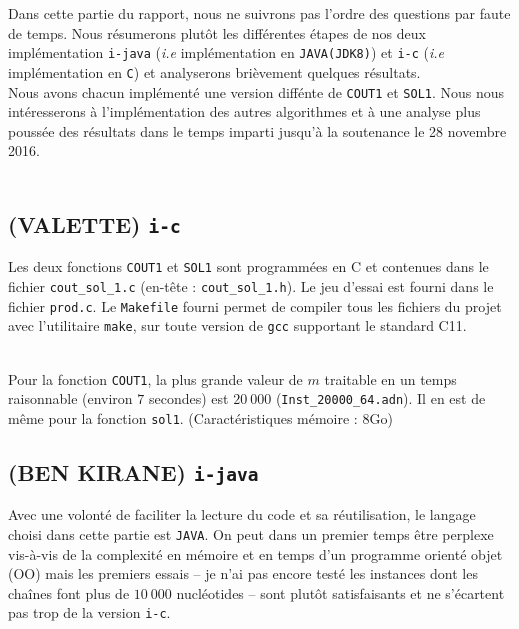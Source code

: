 Dans cette partie du rapport, nous ne suivrons pas l'ordre des
questions par faute de temps. Nous r\'esumerons plut\^ot les
différentes \'etapes de nos deux impl\'ementation \verb'i-java'
(\emph{i.e} impl\'ementation en \verb'JAVA(JDK8)') et \verb'i-c'
(\emph{i.e} impl\'ementation en \verb'C') et analyserons bri\`evement
quelques r\'esultats.\\

Nous avons chacun impl\'ement\'e une version diff\'ente de
\verb'COUT1' et \verb'SOL1'. Nous nous int\'eresserons \`a
l'impl\'ementation des autres algorithmes et \`a une analyse plus
pouss\'ee des r\'esultats dans le temps imparti jusqu'\`a la
soutenance le 28 novembre 2016.\\\\

\subsection{(VALETTE) \texttt{i-c}}
Les deux fonctions \texttt{COUT1} et \texttt{SOL1} sont programm\'ees
en C et contenues dans le fichier \texttt{cout\_sol\_1.c} (en-t\^ete :
\texttt{cout\_sol\_1.h}). Le jeu d'essai est fourni dans le fichier
\texttt{prod.c}. Le \texttt{Makefile} fourni permet de compiler tous
les fichiers du projet avec l'utilitaire \texttt{make}, sur toute
version de \texttt{gcc} supportant le standard C11.\\\\

\begin{figure*}[h]
\centering
{}
\end{figure*}

Pour la fonction \texttt{COUT1}, la plus grande valeur de $m$
traitable en un temps raisonnable (environ $7$ secondes) est $20\ 000$
(\texttt{Inst\_20000\_64.adn}). Il en est de m\^eme pour la fonction
\texttt{sol1}. (Caract\'eristiques m\'emoire : $8$Go)

\subsection{(BEN KIRANE) \texttt{i-java}}
Avec une volont\'e de faciliter la lecture du code et sa
r\'eutilisation, le langage choisi dans cette partie est
\texttt{JAVA}. On peut dans un premier temps \^etre perplexe
vis-\`a-vis de la complexit\'e en m\'emoire et en temps d'un programme
orient\'e objet (OO) mais les premiers essais -- je n'ai pas encore
test\'e les instances dont les cha\^ines font plus de $10\ 000$
nucl\'eotides -- sont plut\^ot satisfaisants et ne s'\'ecartent pas trop
de la version \verb'i-c'. 

